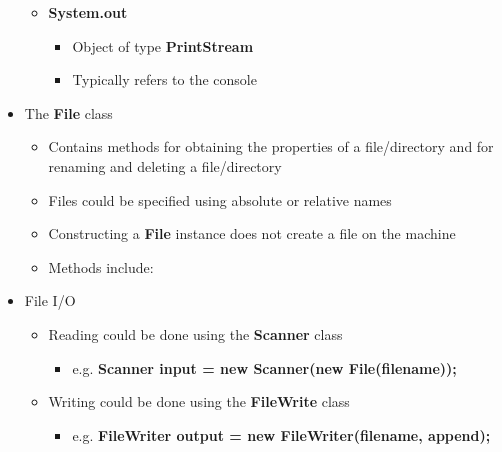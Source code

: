 \documentclass[11pt]{article}
\begin{document}
\begin{itemize}
\begin{itemize}
			\item \textbf{System.out}
				\begin{itemize}
					\item Object of type \textbf{PrintStream}
					\item Typically refers to the console
				\end{itemize}
		\end{itemize}

	\item The \textbf{File} class
		\begin{itemize}
			\item Contains methods for obtaining the properties of a file/directory and
			for renaming and deleting a file/directory
			\item Files could be specified using absolute or relative names
			\item Constructing a \textbf{File} instance does not create a file on the machine
			\item Methods include:
		\end{itemize}

	\item File I/O
		\begin{itemize}
			\item Reading could be done using the \textbf{Scanner} class
				\begin{itemize}
					\item e.g. \textbf{Scanner input = new Scanner(new File(filename));}
				\end{itemize}
			\item Writing could be done using the \textbf{FileWrite} class
				\begin{itemize}
					\item e.g. \textbf{FileWriter output = new FileWriter(filename, append);}
				\end{itemize}
		\end{itemize}


\end{itemize}
\end{document}
